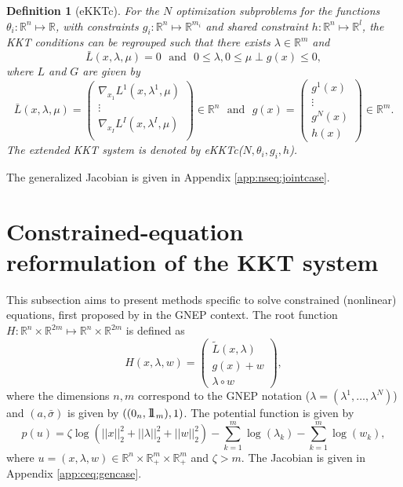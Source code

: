 \documentclass[11pt, a4paper]{article}
\newcommand{\II}{\mbox{\large 1\hskip -0,353em 1}}
\newcommand{\txtm}[1]{\textrm{~~#1~~}}
\newcommand{\R}{\ensuremath{\mathbb{R}}}
\newtheorem{mydef}{Definition}
\begin{document}
\begin{mydef}[eKKTc]
For the $N$ optimization subproblems for the functions $\theta_i: \R^{n} \mapsto \R$, with constraints $g_i: \R^{n} \mapsto \R^{m_i}$ and shared constraint $h:\R^n \mapsto \R^l$, the KKT conditions can be regrouped such that
there exists $\lambda \in \R^m$ and 
$$
\bar L(x, \lambda, \mu) = 0 \txtm{and} 0 \leq \lambda, 0 \leq \mu \perp g(x) \leq  0,
$$
where $L$ and $G$ are given by
$$
\bar L(x, \lambda, \mu) = 
\left( 
\begin{matrix}
\nabla_{x_1} L ^1(x, \lambda^1, \mu) \\
\vdots \\
\nabla_{x_I} L ^I(x, \lambda^I, \mu) \\
\end{matrix}
\right)  
\in \R^{n}
\txtm{and}
g(x) = 
\left( 
\begin{matrix}
g^1(x) \\
\vdots \\
g^N(x) \\
h(x) 
\end{matrix}
\right) 
\in \R^{m}.
$$
The extended KKT system is denoted by eKKTc($N, \theta_i, g_i, h$).
\end{mydef}
The generalized Jacobian is given in Appendix \ref{app:nseq:jointcase}.



\section{Constrained-equation reformulation of the KKT system}

This subsection aims to present methods specific to solve constrained (nonlinear) equations, first proposed by \cite{kanzowfacchetal11} in the GNEP context.
The root function $H: \R^n \times \R^{2m} \mapsto  \R^n \times \R^{2m}$ is defined as
$$
H(x, \lambda, w) = 
\left( 
\begin{matrix}
\tilde L(x, \lambda) \\
g(x) + w \\
\lambda \circ w 
\end{matrix}
\right) ,
$$
where the dimensions $n, m$ correspond to the GNEP notation ($ \lambda = (\lambda^1, \dots, \lambda^N)$) and $(a, \bar \sigma)$ is given by $((0_{n}, \II_{m}), 1)$. The potential function is given by
$$
p\left(u \right) = \zeta \log\left( ||x||_2^2 + ||\lambda ||_2^2+ ||w||_2^2 \right) - 
\sum_{k=1}^{m} \log (\lambda_{k}) - \sum_{k=1}^{m} \log (w_{k}),
$$
where $u=(x, \lambda, w) \in \R^n \times \R_{+}^{m} \times \R_{+}^{m}$
and $\zeta > m$. 
The Jacobian is given in Appendix \ref{app:ceq:gencase}.
\end{document}
